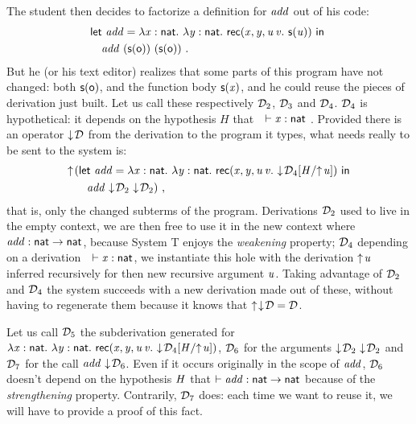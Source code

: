 \documentclass[9pt]{sigplanconf}
\begin{document}
The student then decides to factorize a definition for $\var{add}$ out
of his code:
\begin{align*}
  &\letb{add}{\tlam x {\cst{nat}} \tlam y {\cst{nat}} \recb {\var x}
    {\var y} u v {\s{\var u}}}
  \\
  &\quad\app{\var{add}}\app{(\s\z)}{(\s\z)} \ \text{.}
\end{align*}
But he (or his text editor) realizes that some parts of this program
have not changed: both $\s\z$, and the function body $\s{\var x}$, and
he could reuse the pieces of derivation just built. Let us call these
respectively $\md_2$, $\md_3$ and $\md_4$. $\md_4$ is hypothetical: it
depends on the hypothesis $H$ that\ \ $\vdash \var x:\cst{nat}$ .
Provided there is an operator $\fget\md$ from the derivation to the
program it types, what needs really to be sent to the system is:
\begin{align*}
  &\finfer{}(
    \letb{add}{\tlam x {\cst{nat}} \tlam y {\cst{nat}} \recb {\var x}
      {\var y} u v {\fget{\gsubst{\md_4}{\msubst{H}{\finfer{\var u}}}}}}
    \\&\qquad
    \app{\var{add}}\app{\fget{\md_2}}{\fget{\md_2}}
  )
\ \text{,}
\end{align*}
that is, only the changed subterms of the program. Derivations $\md_2$
used to live in the empty context, we are then free to use it in the
new context where $\var{add}:\cst{nat}\to\cst{nat}$, because System
\sysname T enjoys the \emph{weakening} property; $\md_4$ depending on
a derivation\ \ $\vdash\var x:\cst{nat}$, we instantiate this hole
with the derivation $\finfer{\var u}$ inferred recursively for then
new recursive argument $\var u$. Taking advantage of $\md_2$ and
$\md_4$ the system succeeds with a new derivation made out of these,
without having to regenerate them because it knows that
$\finfer{\fget\md} = \md$.

Let us call $\md_5$ the subderivation generated for $\tlam x
{\cst{nat}} \tlam y {\cst{nat}} \recb {\var x} {\var y} u v
{\fget{\gsubst{\md_4}{\msubst H {\finfer{\var u}}}}}$, $\md_6$ for the
arguments $\app{\fget{\md_2}}{\fget{\md_2}}$ and $\md_7$ for the call
$\app{\var{add}} {\fget{\md_6}}$. Even if it occurs originally in the
scope of $\var{add}$, $\md_6$ doesn't depend on the hypothesis $\var
H$ that $\vdash \var{add}:\cst{nat}\to\cst{nat}$ because of the
\emph{strengthening} property. Contrarily, $\md_7$ does: each time we
want to reuse it, we will have to provide a proof of this fact.
\end{document}
